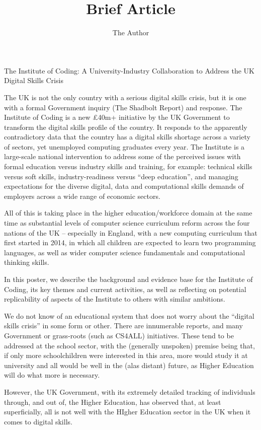 \documentclass[11pt]{article} %
\title{Brief Article}
\author{The Author}
\begin{document}
{}

 
\noindent
The Institute of Coding: A University-Industry Collaboration to Address the UK Digital Skills Crisis

\noindent
The UK is not the only country with a serious digital skills crisis, but it is one with a formal Government inquiry (The Shadbolt Report) and response.
The Institute of Coding is a new \pounds40m+ initiative by the UK
Government to transform the digital skills profile of the country. It responds to the apparently contradictory data that
the country has a digital skills shortage across a variety of sectors,
yet unemployed computing graduates every year. The Institute is a
large-scale national intervention to address some of the perceived
issues with formal education versus industry skills and training, for
example: technical skills versus soft skills, industry-readiness
versus ``deep education'', and managing expectations for the diverse
digital, data and computational skills demands of employers across a
wide range of economic sectors.

All of this is taking place in the higher education/workforce domain
at the same time as substantial levels of computer science curriculum
reform across the four nations of the UK -- especially in England,
with a new computing curriculum that first started in 2014, in which
all children are expected to learn two programming languages, as well
as wider computer science fundamentals and computational thinking
skills.

In this poster, we describe the background and evidence base for the
Institute of Coding, its key themes and current activities, as
well as reflecting on potential replicability of aspects of the
Institute to others with similar ambitions.

\noindent
We do not know of an educational system that does not worry about the ``digital skills crisis'' in some form or other. There are innumerable reports, and many Government or grass-roots (such as CS4ALL) initiatives.  These tend to be addressed at the school sector, with the (generally unspoken) premise being that, if only more schoolchildren were interested in this area, more would study it at university and all would be well in the (alas distant) future, as Higher Education will do what more is necessary.

However, the UK Government, with its extremely detailed tracking of individuals through, and out of, the Higher Education, has observed that, at least superficially, all is not well with the HIgher Education sector in the UK when it comes to digital skills.
\end{document}
